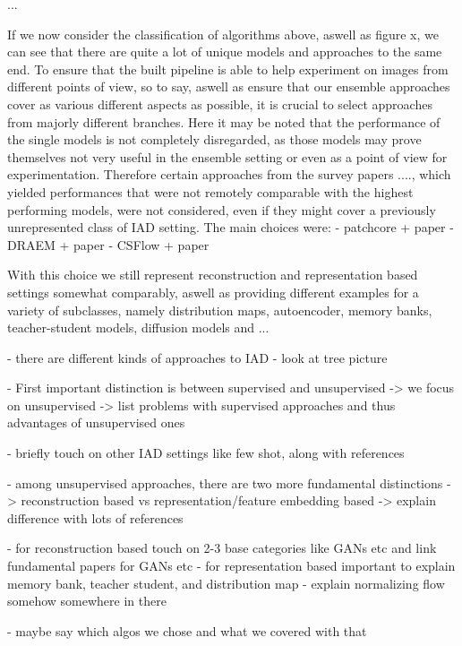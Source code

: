 ... 


If we now consider the classification of algorithms above, aswell as figure x, we can see that there are quite a lot of unique models and approaches to the same end. To ensure that the built 
pipeline is able to help experiment on images from different points of view, so to say, aswell as ensure that our ensemble approaches cover as various different aspects as possible, it is 
crucial to select approaches from majorly different branches. Here it may be noted that the performance of the single models is not completely disregarded, as those models may prove themselves 
not very useful in the ensemble setting or even as a point of view for experimentation. Therefore certain approaches from the survey papers ...., which yielded performances that were not 
remotely comparable with the highest performing models, were not considered, even if they might cover a previously unrepresented class of IAD setting. 
The main choices were:
- patchcore + paper
- DRAEM + paper
- CSFlow + paper

With this choice we still represent reconstruction and representation based settings somewhat comparably, aswell as providing different examples for a variety of subclasses, namely
distribution maps, autoencoder, memory banks, teacher-student models, diffusion models and ...



- there are different kinds of approaches to IAD
- look at tree picture
 
- First important distinction is between supervised and unsupervised
-> we focus on unsupervised
-> list problems with supervised approaches and thus advantages of unsupervised ones

- briefly touch on other IAD settings like few shot, along with references

- among unsupervised approaches, there are two more fundamental distinctions
-> reconstruction based vs representation/feature embedding based
-> explain difference with lots of references

- for reconstruction based touch on 2-3 base categories like GANs etc and link fundamental papers for GANs etc
- for representation based important to explain memory bank, teacher student, and distribution map
- explain normalizing flow somehow somewhere in there

- maybe say which algos we chose and what we covered with that



